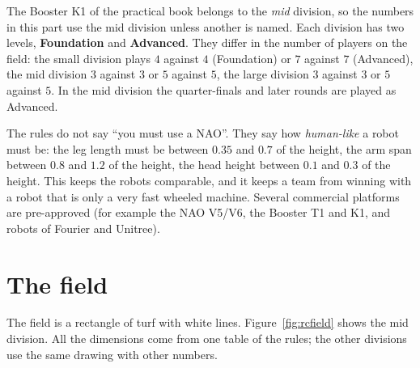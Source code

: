 The Booster K1 of the practical book belongs to the \emph{mid} division, so the numbers in this part use the mid division unless another is named. Each division has two levels, \textbf{Foundation} and \textbf{Advanced}. They differ in the number of players on the field: the small division plays $4$ against $4$ (Foundation) or $7$ against $7$ (Advanced), the mid division $3$ against $3$ or $5$ against $5$, the large division $3$ against $3$ or $5$ against $5$. In the mid division the quarter-finals and later rounds are played as Advanced.

\begin{aibox}
The rules do not say ``you must use a NAO''. They say how \emph{human-like} a robot must be: the leg length must be between $0.35$ and $0.7$ of the height, the arm span between $0.8$ and $1.2$ of the height, the head height between $0.1$ and $0.3$ of the height. This keeps the robots comparable, and it keeps a team from winning with a robot that is only a very fast wheeled machine. Several commercial platforms are pre-approved (for example the NAO V5/V6, the Booster T1 and K1, and robots of Fourier and Unitree).
\end{aibox}

\section*{The field}
The field is a rectangle of turf with white lines. Figure~\ref{fig:rcfield} shows the mid division. All the dimensions come from one table of the rules; the other divisions use the same drawing with other numbers.


